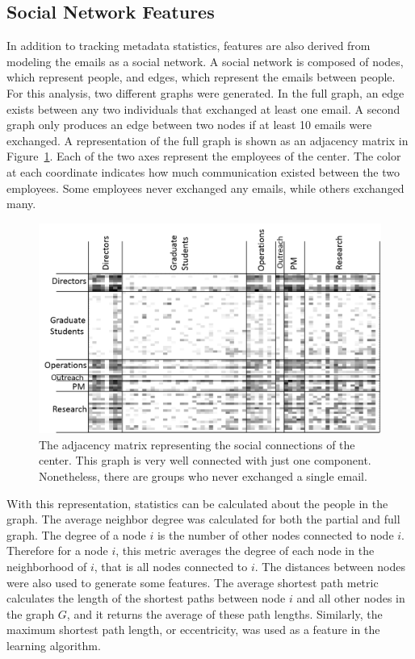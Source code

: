 \documentclass[10pt,twocolumn,conference]{IEEEtran}
\begin{document}
\subsection{Social Network Features}
In addition to tracking metadata statistics, features are also derived from modeling the emails as a social network.
A social network is composed of nodes, which represent people, and edges, which represent the emails between people.  For this analysis, two different graphs were generated.
In the full graph, an edge exists between any two individuals that exchanged at least one email.
A second graph only produces an edge between two nodes if at least 10 emails were exchanged.
A representation of the full graph is shown as an adjacency matrix in Figure~\ref{fig:adj_matrix}.
Each of the two axes represent the employees of the center.
The color at each coordinate indicates how much communication existed between the two employees.
Some employees never exchanged any emails, while others exchanged many.

\begin{figure}[t]
    \centering
    \includegraphics[width=\columnwidth,trim={4mm 0mm 0mm 5mm},clip]{adj_matrix}
    \vspace{-14pt}
    \caption{The adjacency matrix representing the social connections of the center.  This graph is very well connected with just one component.  Nonetheless, there are groups who never exchanged a single email.}
    \vspace{-14pt}
    \label{fig:adj_matrix}
\end{figure}

With this representation, statistics can be calculated about the people in the graph.
The average neighbor degree was calculated for both the partial and full graph.
The degree of a node $i$ is the number of other nodes connected to node $i$.
Therefore for a node $i$, this metric averages the degree of each node in the neighborhood of $i$, that is all nodes connected to $i$.
The distances between nodes were also used to generate some features.
The average shortest path metric calculates the length of the shortest paths between node $i$ and all other nodes in the graph $G$, and it returns the average of these path lengths.
Similarly, the maximum shortest path length, or eccentricity, was used as a feature in the learning algorithm.  
\end{document}
